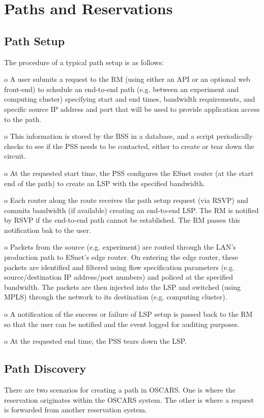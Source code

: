 \documentclass[conference]{IEEEtran}
\begin{document}
\section{Paths and Reservations}

\subsection{Path Setup}

The procedure of a typical path setup is as follows:

o A user submits a request to the RM (using either an API or
an optional web front-end) to schedule an end-to-end path (e.g. between an
experiment and computing cluster) specifying start and end times, bandwidth
requirements, and specific source IP address and port that will be used to     
provide application access to the path.

o This information is stored by the BSS in a database, and a script 
periodically checks to see if the PSS needs to be contacted, either to create 
or tear down the circuit.

o At the requested start time, the PSS configures the ESnet router
(at the start end of the path) to create an LSP with the
specified bandwidth.

o Each router along the route receives the path setup request (via RSVP)
and commits bandwidth (if available) creating an end-to-end LSP.  The RM is
notified by RSVP if the end-to-end path cannot be established.  The RM
passes this notification bak to the user.

o Packets from the source (e.g. experiment) are routed through the
LAN's production path to ESnet's edge router.  On entering the edge router,
these packets are identified and filtered using flow specification parameters
(e.g. source/destination IP address/port numbers) and policed at the specified
bandwidth.  The packets are then injected into the LSP and switched (using MPLS)
through the network to its destination (e.g. computing cluster).

o A notification of the success or failure of LSP setup is 
passed back to the RM so that the user can be notified and the event 
logged for auditing purposes.

o At the requested end time, the PSS tears down the LSP.

\subsection{Path Discovery}
There are two scenarios for creating a path in OSCARS.  One is where the
reservation originates within the OSCARS system.  The other is where a request
is forwarded from another reservation system. 
\end{document}
